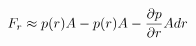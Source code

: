 \documentclass[preview]{standalone}
\begin{document}
\begin{align*}
\special{dvisvgm:raw <g id='unique000'>}F_r \approx p(r)A - p(r) A - \frac{\partial p}{\partial r} A dr\special{dvisvgm:raw </g>}
\end{align*}
\end{document}

